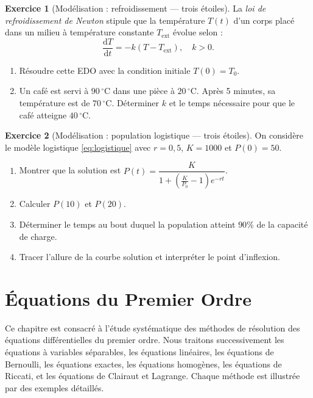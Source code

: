 \documentclass[12pt,a4paper,openany]{book}
\theoremstyle{definition}
\newtheorem{exercice}{Exercice}[chapter]
\theoremstyle{plain}
\theoremstyle{remark}
\newcommand{\dd}{\mathrm{d}}
\begin{document}
\begin{exercice}[Modélisation : refroidissement --- {\small trois étoiles}]
\label{exo:ch1-refroidissement}
La \emph{loi de refroidissement de Newton} stipule que la température $T(t)$ d'un corps placé dans un milieu à température constante $T_{\mathrm{ext}}$ évolue selon :
\[
\frac{\dd T}{\dd t} = -k(T - T_{\mathrm{ext}}), \quad k > 0.
\]
\begin{enumerate}[label=(\alph*)]
\item Résoudre cette EDO avec la condition initiale $T(0) = T_0$.
\item Un café est servi à $90\,{}^{\circ}\mathrm{C}$ dans une pièce à $20\,{}^{\circ}\mathrm{C}$. Après 5 minutes, sa température est de $70\,{}^{\circ}\mathrm{C}$. Déterminer $k$ et le temps nécessaire pour que le café atteigne $40\,{}^{\circ}\mathrm{C}$.
\end{enumerate}
\end{exercice}

\begin{exercice}[Modélisation : population logistique --- {\small trois étoiles}]
\label{exo:ch1-logistique}
On considère le modèle logistique \eqref{eq:logistique} avec $r = 0{,}5$, $K = 1000$ et $P(0) = 50$.
\begin{enumerate}[label=(\alph*)]
\item Montrer que la solution est $P(t) = \dfrac{K}{1 + \left(\frac{K}{P_0} - 1\right)e^{-rt}}$.
\item Calculer $P(10)$ et $P(20)$.
\item Déterminer le temps au bout duquel la population atteint $90\%$ de la capacité de charge.
\item Tracer l'allure de la courbe solution et interpréter le point d'inflexion.
\end{enumerate}
\end{exercice}

\chapter{Équations du Premier Ordre}
\label{chap:premier-ordre}

Ce chapitre est consacré à l'étude systématique des méthodes de résolution des équations différentielles du premier ordre. Nous traitons successivement les équations à variables séparables, les équations linéaires, les équations de Bernoulli, les équations exactes, les équations homogènes, les équations de Riccati, et les équations de Clairaut et Lagrange. Chaque méthode est illustrée par des exemples détaillés.
\end{document}
